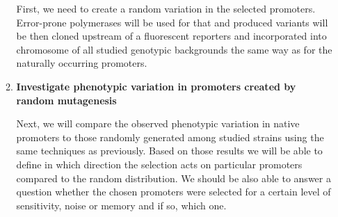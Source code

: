 \begin{enumerate}[font=\bfseries]
\begin{enumerate}[font=\bfseries]
		First, we need to create a random variation in the selected promoters.
		Error-prone polymerases will be used for that and produced variants will be then cloned upstream of a fluorescent reporters and incorporated into chromosome of all studied genotypic backgrounds the same way as for the naturally occurring promoters.

		\item \textbf{Investigate phenotypic variation in promoters created by random mutagenesis}
		
		Next, we will compare the observed phenotypic variation in native promoters to those randomly generated among studied strains using the same techniques as previously.
		Based on those results we will be able to define in which direction the selection acts on particular promoters compared to the random distribution.
		We should be also able to answer a question whether the chosen promoters were selected for a certain level of sensitivity, noise or memory and if so, which one.

	
	\end{enumerate}

\end{enumerate}


\shorthandon{-} 
